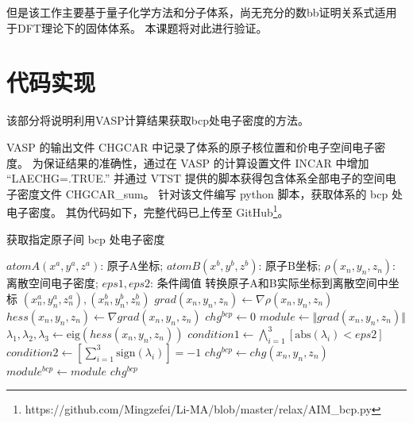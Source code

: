 但是该工作主要基于量子化学方法和分子体系，尚无充分的数bb证明关系式适用于DFT理论下的固体体系。
本课题将对此进行验证。

\section{代码实现}

该部分将说明利用VASP计算结果获取bcp处电子密度的方法。

VASP 的输出文件 CHGCAR 中记录了体系的原子核位置和价电子空间电子密度。
为保证结果的准确性，通过在 VASP 的计算设置文件 INCAR 中增加 “LAECHG=.TRUE.” 并通过 VTST 提供的脚本获得包含体系全部电子的空间电子密度文件 CHGCAR\_sum。
针对该文件编写 python 脚本，获取体系的 bcp 处电子密度。
其伪代码如下，完整代码已上传至 GitHub\footnote{https://github.com/Mingzefei/Li-MA/blob/master/relax/AIM\_bcp.py}。


\begin{algorithm}
	\renewcommand{\algorithmicrequire}{\textbf{Input:}}
	\renewcommand{\algorithmicensure}{\textbf{Output:}}

    \caption{获取指定原子间 bcp 处电子密度}
	\label{alg1}
	\begin{algorithmic}[1]
                \Require 
                        $atomA(x^a,y^a,z^a)$: 原子A坐标;
                        $atomB(x^b,y^b,z^b)$: 原子B坐标;
                        $\rho(x_n,y_n,z_n)$: 离散空间电子密度;
                        $eps1,eps2$: 条件阈值
                \State 转换原子A和B实际坐标到离散空间中坐标 $(x_n^a,y_n^a,z_n^a),(x_n^b,y_n^b,z_n^b)$
                \State $ grad(x_n,y_n,z_n) \gets \nabla \rho(x_n,y_n,z_n)$
                \State $ hess(x_n,y_n,z_n) \gets \nabla grad(x_n,y_n,z_n)$
                \State $ chg^{bcp} \gets 0$
                        \State $ module \gets \Vert grad(x_n,y_n,z_n) \Vert$
                                \State $\lambda_1,\lambda_2,\lambda_3 \gets \mathrm{eig}(hess(x_n,y_n,z_n)) $
                                \State $condition1 \gets \bigwedge_{i=1}^3 \left[\mathrm{abs}(\lambda_i)< eps2\right]$
                                \State $condition2 \gets \left[\sum_{i=1}^3 \mathrm{sign}(\lambda_i)\right] = -1$
                                                \State $chg^{bcp} \gets chg(x_n,y_n,z_n)$
                                                \State $module^{bcp} \gets module $
                                        \EndIf
                                \EndIf
                        \EndIf
                \EndFor
                \EndFor
                \EndFor
                \Ensure $chg^{bcp}$
	\end{algorithmic} 
\end{algorithm}

